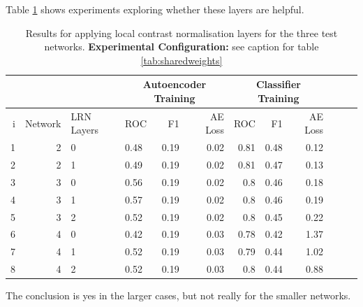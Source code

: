 Table \ref{tab:lrn} shows experiments exploring whether these layers are helpful.
\begin{table}[!h] \centering
{\small
\begin{tabular}{rrllrrrrrrrr}
  &&&   \multicolumn{3}{|c|}{Autoencoder Training} &  \multicolumn{3}{c|}{Classifier Training}    \\
\hline
  i & Network             & LRN Layers   &    ROC&F1&AE Loss & ROC & F1 & AE Loss \\
\hline
 1 & 2 & 0  &    0.48 &   0.19 &     0.02 &    0.81 &   0.48 &     0.12 \\
 2 & 2 & 1  &    0.49 &   0.19 &     0.02 &    0.81 &   0.47 &     0.13 \\
\hline
 3 & 3 & 0  &    0.56 &   0.19 &     0.02 &    0.8  &   0.46 &     0.18 \\
 4 & 3 & 1  &    0.57 &   0.19 &     0.02 &    0.8  &   0.46 &     0.19 \\
 5 & 3 & 2  &    0.52 &   0.19 &     0.02 &    0.8  &   0.45 &     0.22 \\
\hline
 6 & 4 & 0  &    0.42 &   0.19 &     0.03 &    0.78 &   0.42 &     1.37 \\
 7 & 4 & 1  &    0.52 &   0.19 &     0.03 &    0.79 &   0.44 &     1.02 \\
 8 & 4 & 2  &    0.52 &   0.19 &     0.03 &    0.8  &   0.44 &     0.88 \\
 \hline
\end{tabular}}\caption{Results for applying local contrast normalisation layers
for the three test networks. {\bf Experimental Configuration:} see caption
for table \ref{tab:sharedweights}}\label{tab:lrn}  \end{table}

The conclusion is yes in the larger cases, but not really for the smaller networks.

\newpage
%
%
%
%
%
%
